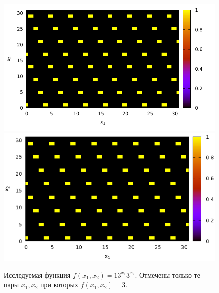 \begin{figure}
\centering
\ifpdf
\includegraphics[angle=0]
{./part4/quantcomp/picdiscretlog1.pdf}
\else
\includegraphics[angle=0]
{./part4/quantcomp/picdiscretlog1.eps}
\fi

%

\caption{Исследуемая функция $f(x_1, x_2) = 13^{x_1}3^{x_2}$. Отмечены
только те пары $x_1, x_2$ при которых $f(x_1, x_2) = 3$.} 
\label{fig:part4:quantcomp:dl1}
\end{figure}

